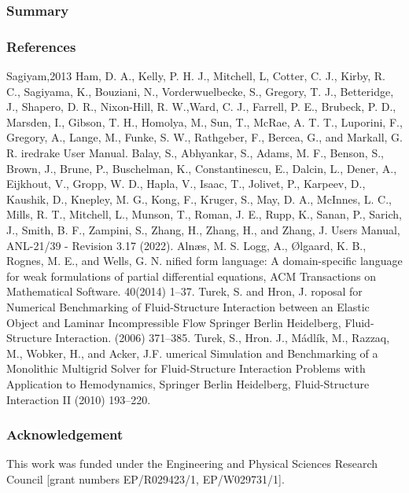 \documentclass[]{beamer}
\begin{document}
\begin{frame}
\frametitle{Summary}
\end{frame}
\begin{frame}%
\frametitle{References}
\fontsize{5pt}{5}\selectfont
\begin{thebibliography}{Sagiyam,2013}
Ham, D. A., Kelly, P. H. J., Mitchell, L, Cotter, C. J., Kirby, R. C., Sagiyama, K., Bouziani, N., Vorderwuelbecke, S., Gregory, T. J., Betteridge, J., Shapero, D. R., Nixon-Hill, R. W.,Ward, C. J., Farrell, P. E., Brubeck, P. D., Marsden, I., Gibson, T. H., Homolya, M., Sun, T., McRae, A. T. T., Luporini, F., Gregory, A., Lange, M., Funke, S. W., Rathgeber, F., Bercea, G., and Markall, G. R.
iredrake {U}ser {M}anual.
Balay, S., Abhyankar, S., Adams, M. F., Benson, S., Brown, J., Brune, P., Buschelman, K., Constantinescu, E., Dalcin, L., Dener, A., Eijkhout, V., Gropp, W. D., Hapla, V., Isaac, T., Jolivet, P., Karpeev, D., Kaushik, D., Knepley, M. G., Kong, F., Kruger, S., May, D. A., McInnes, L. C., Mills, R. T., Mitchell, L., Munson, T., Roman, J. E., Rupp, K., Sanan, P., Sarich, J., Smith, B. F., Zampini, S., Zhang, H., Zhang, H., and Zhang, J.
 Users Manual,
\newblock ANL-21/39 - Revision 3.17 (2022).
Aln\ae{}s, M. S. Logg, A., \O{}lgaard, K. B., Rognes, M. E., and Wells, G. N.
nified form language: {A} domain-specific language for weak formulations of partial differential equations,
\newblock ACM Transactions on Mathematical Software. 40(2014) 1--37.
Turek, S. and Hron, J.
roposal for {N}umerical {B}enchmarking of {F}luid-{S}tructure {I}nteraction between an {E}lastic {O}bject and {L}aminar {I}ncompressible {F}low
\newblock Springer Berlin Heidelberg, Fluid-Structure Interaction. (2006) 371--385.
Turek, S., Hron. J., M\'{a}dl\'{i}k, M., Razzaq, M., Wobker, H., and Acker, J.F.
umerical {S}imulation and {B}enchmarking of a {M}onolithic {M}ultigrid {S}olver for {F}luid-{S}tructure {I}nteraction {P}roblems with {A}pplication to {H}emodynamics,
\newblock Springer Berlin Heidelberg, Fluid-Structure Interaction II (2010) 193--220.
\end{thebibliography}
\end{frame}
\begin{frame}
\frametitle{Acknowledgement}
This work was funded under
the Engineering and Physical
Sciences Research Council [grant numbers EP/R029423/1, EP/W029731/1].
\end{frame}
\end{document}
